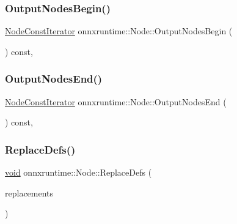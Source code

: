 \mbox{\label{classonnxruntime_1_1Node_aac357428a320fca4f9d52e05e2dd44fe}} 
\subsubsection{\texorpdfstring{Output\+Nodes\+Begin()}{OutputNodesBegin()}}
{\footnotesize\ttfamily \mbox{\hyperlink{classonnxruntime_1_1Node_1_1NodeConstIterator}{Node\+Const\+Iterator}} onnxruntime\+::\+Node\+::\+Output\+Nodes\+Begin (\begin{DoxyParamCaption}{ }\end{DoxyParamCaption}) const\hspace{0.3cm}{\ttfamily [inline]}, {\ttfamily [noexcept]}}

\mbox{\label{classonnxruntime_1_1Node_a60e3a6caa17f877df67ab51f9aa973d8}} 
\subsubsection{\texorpdfstring{Output\+Nodes\+End()}{OutputNodesEnd()}}
{\footnotesize\ttfamily \mbox{\hyperlink{classonnxruntime_1_1Node_1_1NodeConstIterator}{Node\+Const\+Iterator}} onnxruntime\+::\+Node\+::\+Output\+Nodes\+End (\begin{DoxyParamCaption}{ }\end{DoxyParamCaption}) const\hspace{0.3cm}{\ttfamily [inline]}, {\ttfamily [noexcept]}}

\mbox{\label{classonnxruntime_1_1Node_aa31e823c0e4219de6709f17742ac07de}} 
\subsubsection{\texorpdfstring{Replace\+Defs()}{ReplaceDefs()}}
{\footnotesize\ttfamily \mbox{\hyperlink{mlasi_8h_a88f941d423cb2a819b70a1358982b1a6}{void}} onnxruntime\+::\+Node\+::\+Replace\+Defs (\begin{DoxyParamCaption}\item[{const std\+::map$<$ const \mbox{\hyperlink{classonnxruntime_1_1NodeArg}{onnxruntime\+::\+Node\+Arg}} $\ast$, \mbox{\hyperlink{classonnxruntime_1_1NodeArg}{onnxruntime\+::\+Node\+Arg}} $\ast$$>$ \&}]{replacements }\end{DoxyParamCaption})}

